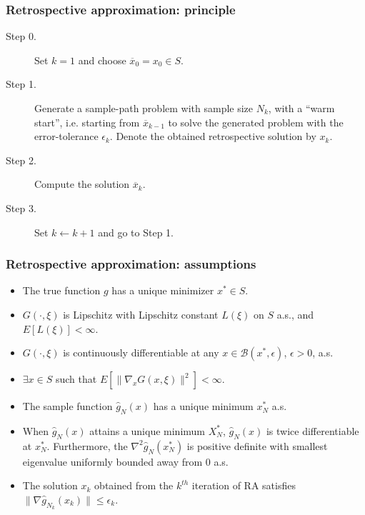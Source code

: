 \documentclass{beamer}
\def\cB{\mathcal{B}}
\begin{document}
\begin{frame}
\frametitle{Retrospective approximation: principle}

\begin{description}
\item[Step 0.]
Set $k = 1$ and choose $\overline{x}_0 = x_0 \in S$.
\item[Step 1.]
Generate a sample-path problem with sample size $N_k$, with a ``warm start'', i.e. starting from $\overline{x}_{k-1}$ %
to solve the generated problem with the error-tolerance $\epsilon_k$.
Denote the obtained retrospective solution by $x_k$.
\item[Step 2.]
Compute the solution $\overline{x}_k$.
\item[Step 3.]
Set $k \leftarrow k + 1$ and go to Step 1.
\end{description}

\end{frame}

\begin{frame}
\frametitle{Retrospective approximation: assumptions}

\begin{itemize}
\item
The true function $g$ has a unique minimizer $x^* \in S$.
\item
$G(\cdot,\xi)$ is Lipschitz with Lipschitz constant $L(\xi)$ on $S$ a.s., and $E[L(\xi)] < \infty$.
\item
$G(\cdot,\xi)$ is continuously differentiable at any $x \in \cB(x^*, \epsilon)$, $\epsilon > 0$, a.s.
\item
$\exists x \in S$ such that $E[\|\nabla_x G(x,\xi)\|^2] < \infty$.
\item
The sample function $\hat{g}_N(x)$ has a unique minimum $x_N^*$ a.s.
\item
When $\hat{g}_N(x)$ attains a unique minimum $X_N^*$, $\hat{g}_N(x)$ is twice differentiable at $x_N^*$.
Furthermore, the $\nabla^2 \hat{g}_N (x_N^*)$ is positive definite with smallest eigenvalue uniformly bounded away from 0 a.s.
\item
The solution $x_k$ obtained from the $k^{th}$ iteration of RA satisfies $\| \nabla \hat{g}_{N_k}(x_k) \| \leq \epsilon_k$.
\end{itemize}

\end{frame}
\end{document}
